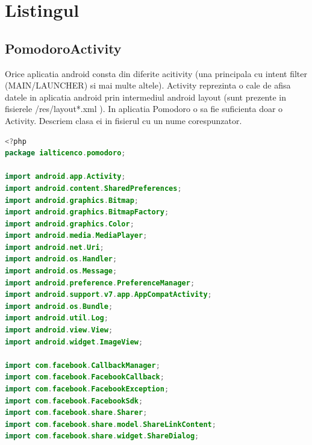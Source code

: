 \documentclass[12pt]{article}
\begin{document}
\section {Listingul}
\subsection{PomodoroActivity}
Orice aplicatia android consta din diferite acitivity (una principala cu intent filter (MAIN/LAUNCHER) si mai multe altele). Activity reprezinta o cale de afisa datele in aplicatia android prin intermediul android layout (sunt prezente in fisierele /res/layout*.xml ). In aplicatia Pomodoro o sa fie suficienta doar o Activity. Descriem clasa ei in fisierul cu un nume corespunzator.
\begin{lstlisting}[language=java, caption={Fisierul PomodoroActivity.java}, label=list2]
<?php
package ialticenco.pomodoro;

import android.app.Activity;
import android.content.SharedPreferences;
import android.graphics.Bitmap;
import android.graphics.BitmapFactory;
import android.graphics.Color;
import android.media.MediaPlayer;
import android.net.Uri;
import android.os.Handler;
import android.os.Message;
import android.preference.PreferenceManager;
import android.support.v7.app.AppCompatActivity;
import android.os.Bundle;
import android.util.Log;
import android.view.View;
import android.widget.ImageView;

import com.facebook.CallbackManager;
import com.facebook.FacebookCallback;
import com.facebook.FacebookException;
import com.facebook.FacebookSdk;
import com.facebook.share.Sharer;
import com.facebook.share.model.ShareLinkContent;
import com.facebook.share.widget.ShareDialog;


\end{lstlisting}
\end{document}
